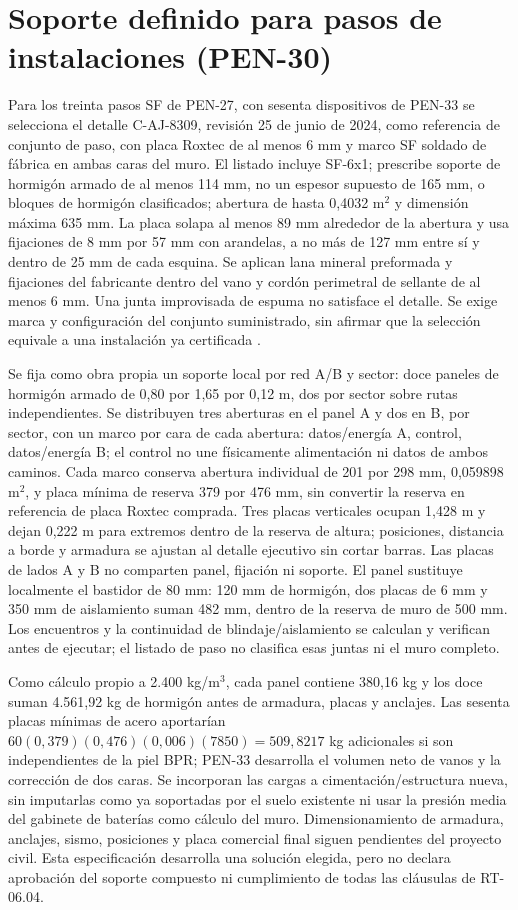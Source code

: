 \section{Soporte definido para pasos de instalaciones (PEN-30)}
\label{sec:sd4-pen30}
Para los treinta pasos SF de PEN-27, con sesenta dispositivos de PEN-33 se selecciona el detalle C-AJ-8309, revisión 25 de junio de 2024, como referencia de conjunto de paso, con placa Roxtec de al menos 6 mm y marco SF soldado de fábrica en ambas caras del muro. El listado incluye SF-6x1; prescribe soporte de hormigón armado de al menos 114 mm, no un espesor supuesto de 165 mm, o bloques de hormigón clasificados; abertura de hasta 0,4032 m$^2$ y dimensión máxima 635 mm. La placa solapa al menos 89 mm alrededor de la abertura y usa fijaciones de 8 mm por 57 mm con arandelas, a no más de 127 mm entre sí y dentro de 25 mm de cada esquina. Se aplican lana mineral preformada y fijaciones del fabricante dentro del vano y cordón perimetral de sellante de al menos 6 mm. Una junta improvisada de espuma no satisface el detalle. Se exige marca y configuración del conjunto suministrado, sin afirmar que la selección equivale a una instalación ya certificada \parencite[pp.~1--4]{lote30-caj8309}.

Se fija como obra propia un soporte local por red A/B y sector: doce paneles de hormigón armado de 0,80 por 1,65 por 0,12 m, dos por sector sobre rutas independientes. Se distribuyen tres aberturas en el panel A y dos en B, por sector, con un marco por cara de cada abertura: datos/energía A, control, datos/energía B; el control no une físicamente alimentación ni datos de ambos caminos. Cada marco conserva abertura individual de 201 por 298 mm, 0,059898 m$^2$, y placa mínima de reserva 379 por 476 mm, sin convertir la reserva en referencia de placa Roxtec comprada. Tres placas verticales ocupan 1,428 m y dejan 0,222 m para extremos dentro de la reserva de altura; posiciones, distancia a borde y armadura se ajustan al detalle ejecutivo sin cortar barras. Las placas de lados A y B no comparten panel, fijación ni soporte. El panel sustituye localmente el bastidor de 80 mm: 120 mm de hormigón, dos placas de 6 mm y 350 mm de aislamiento suman 482 mm, dentro de la reserva de muro de 500 mm. Los encuentros y la continuidad de blindaje/aislamiento se calculan y verifican antes de ejecutar; el listado de paso no clasifica esas juntas ni el muro completo.

Como cálculo propio a 2.400 kg/m$^3$, cada panel contiene 380,16 kg y los doce suman 4.561,92 kg de hormigón antes de armadura, placas y anclajes. Las sesenta placas mínimas de acero aportarían $60(0,379)(0,476)(0,006)(7850)=509,8217$ kg adicionales si son independientes de la piel BPR; PEN-33 desarrolla el volumen neto de vanos y la corrección de dos caras. Se incorporan las cargas a cimentación/estructura nueva, sin imputarlas como ya soportadas por el suelo existente ni usar la presión media del gabinete de baterías como cálculo del muro. Dimensionamiento de armadura, anclajes, sismo, posiciones y placa comercial final siguen pendientes del proyecto civil. Esta especificación desarrolla una solución elegida, pero no declara aprobación del soporte compuesto ni cumplimiento de todas las cláusulas de RT-06.04.

